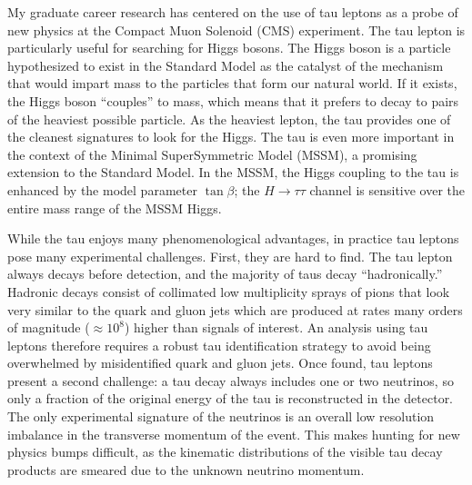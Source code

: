 \documentclass{scrartcl}        %
\date{}
\newcommand{\Sep}{\vspace{2em}}
\begin{document}
\thispagestyle{empty}
\begin{cv}{}
\Sep




My graduate career research has centered on the use of tau leptons as a probe of
new physics at the Compact Muon Solenoid (CMS) experiment.  The tau lepton is
particularly useful for searching for Higgs bosons.  The Higgs boson is a
particle hypothesized to exist in the Standard Model as the catalyst of the
mechanism that would impart mass to the particles that form our natural world.
If it exists, the Higgs boson ``couples'' to mass, which means that it prefers
to decay to pairs of the heaviest possible particle.  As the heaviest lepton,
the tau provides one of the cleanest signatures to look for the Higgs.  The tau
is even more important in the context of the Minimal SuperSymmetric Model
(MSSM), a promising extension to the Standard Model.  In the MSSM, the Higgs
coupling to the tau is enhanced by the model parameter $\tan\beta$; the
$H\to\tau\tau$ channel is sensitive over the entire mass range of the MSSM
Higgs. 

While the tau enjoys many phenomenological advantages, in practice tau leptons
pose many experimental challenges.  First, they are hard to find.  The tau
lepton always decays before detection, and the
majority of taus decay ``hadronically.'' Hadronic decays consist of collimated
low multiplicity sprays of pions that look very similar to
the quark and gluon jets which are produced at rates many orders of magnitude
($\approx 10^8$) higher than signals of interest.  An analysis using tau leptons
therefore requires a robust tau identification strategy to avoid being
overwhelmed by misidentified quark and gluon jets.  Once found, tau leptons
present a second challenge: a tau decay always includes one or two neutrinos, so
only a fraction of the original energy of the tau is reconstructed in the
detector.  The only experimental signature of the neutrinos is an overall low
resolution imbalance in the transverse momentum of the event.  This makes
hunting for new physics bumps difficult, as the kinematic distributions of the
visible tau decay products are smeared due to the unknown neutrino momentum.


\end{cv}
\end{document}
